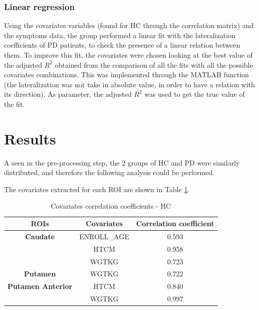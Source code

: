 \documentclass[]{article}
\begin{document}
\begin{multicols}{2}
\subsubsection{Linear regression}

Using the covariates variables (found for HC through the correlation matrix) and the symptoms data, the group performed a linear fit with the lateralization coefficients of PD patients, to check the presence of a linear relation between them. To improve this fit, the covariates were chosen looking at the best value of the adjusted $R^2$ obtained from the comparison of all the fits with all the possible covariates combinations. 
This was implemented through the MATLAB function  (the lateralization was not take in absolute value, in order to have a relation with its direction).
As parameter, the adjusted $R^2$ was used to get the true value of the fit.

\section{Results}

A seen in the pre-processing step, the 2 groups of HC and PD were similarly distributed, and therefore the following analysis could be performed.

The covariates extracted for each ROI are shown in Table \ref{tbl:cov_hc}.

\end{multicols}

\begin{table}[h]
	\centering
	\begin{tabular}{|c|c|c|}
		\hline
		\textbf{ROIs}             & \textbf{Covariates} & \textbf{Correlation coefficient} \\ \hline
		\textbf{Caudate}          & ENROLL\_AGE         & 0.593                            \\ \hline
		\textbf{}                 & HTCM                & 0.958                            \\ \hline
		\textbf{}                 & WGTKG               & 0.723                            \\ \hline
		\textbf{Putamen}          & WGTKG               & 0.722                            \\ \hline
		\textbf{Putamen Anterior} & HTCM                & 0.840                            \\ \hline
		\textbf{}                 & WGTKG               & 0.997                            \\ \hline
	\end{tabular}
	\caption{Covariates correlation coefficients - HC}
	\label{tbl:cov_hc}
\end{table}
\end{document}
